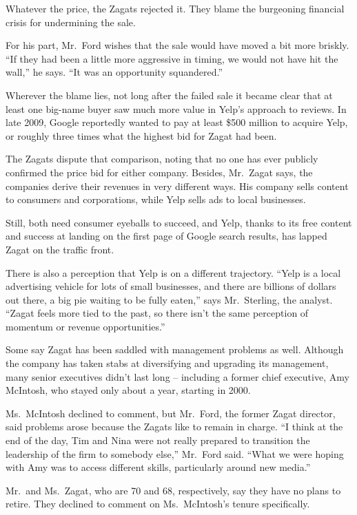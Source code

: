﻿\documentclass[12pt]{article}
\begin{document}
Whatever the price, the Zagats rejected it. They blame the burgeoning financial crisis for
undermining the sale.

For his part, Mr.~Ford wishes that the sale would have moved a bit more briskly. ``If they had been
a little more aggressive in timing, we would not have hit the wall,'' he says. ``It was an
opportunity squandered.''

Wherever the blame lies, not long after the failed sale it became clear that at least one big-name
buyer saw much more value in Yelp's approach to reviews. In late 2009, Google reportedly wanted to
pay at least \$500 million to acquire Yelp, or roughly three times what the highest bid for Zagat
had been.

The Zagats dispute that comparison, noting that no one has ever publicly confirmed the price bid for
either company. Besides, Mr.~Zagat says, the companies derive their revenues in very different ways.
His company sells content to consumers and corporations, while Yelp sells ads to local businesses.

Still, both need consumer eyeballs to succeed, and Yelp, thanks to its free content and success at
landing on the first page of Google search results, has lapped Zagat on the traffic front.

There is also a perception that Yelp is on a different trajectory. ``Yelp is a local advertising
vehicle for lots of small businesses, and there are billions of dollars out there, a big pie waiting
to be fully eaten,'' says Mr.~Sterling, the analyst. ``Zagat feels more tied to the past, so there
isn't the same perception of momentum or revenue opportunities.''

Some say Zagat has been saddled with management problems as well. Although the company has taken
stabs at diversifying and upgrading its management, many senior executives didn't last long --
including a former chief executive, Amy McIntosh, who stayed only about a year, starting in 2000.

Ms.~McIntosh declined to comment, but Mr.~Ford, the former Zagat director, said problems arose
because the Zagats like to remain in charge. ``I think at the end of the day, Tim and Nina were not
really prepared to transition the leadership of the firm to somebody else,'' Mr.~Ford said. ``What
we were hoping with Amy was to access different skills, particularly around new media.''

Mr.~and Ms.~Zagat, who are 70 and 68, respectively, say they have no plans to retire. They declined
to comment on Ms.~McIntosh's tenure specifically.
\end{document}
